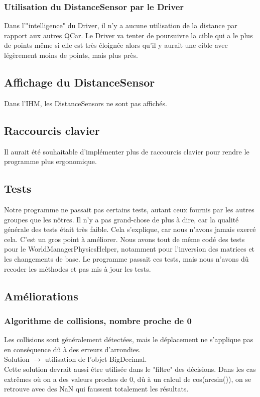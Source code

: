 \documentclass[a4paper, 12pt]{article}
\begin{document}
\subsubsection{Utilisation du DistanceSensor par le Driver}
Dans l'"intelligence" du Driver, il n'y a aucune utilisation de la distance par rapport aux autres QCar. Le Driver va tenter de poursuivre la cible qui a le plus de points même si elle est très éloignée alors qu'il y aurait une cible avec légèrement moins de points, mais plus près.
\subsection{Affichage du DistanceSensor} Dans l'IHM, les DistanceSensors ne sont pas affichés.
\subsection{Raccourcis clavier} Il aurait été souhaitable d'implémenter plus de raccourcis clavier pour rendre le programme plus ergonomique. 
\subsection{Tests}
Notre programme ne passait pas certains tests, autant ceux fournis par les autres groupes que les nôtres. Il n'y a pas grand-chose de plus à dire, car la qualité générale des tests était très faible. Cela s'explique, car nous n'avons jamais exercé cela. C'est un gros point à améliorer. Nous avons tout de même codé des tests pour le WorldManagerPhysicsHelper, notamment pour l'inversion des matrices et les changements de base. Le programme passait ces tests, mais nous n’avons dû recoder les méthodes et pas mis à jour les tests.
\subsection{Améliorations}
\subsubsection{Algorithme de collisions, nombre proche de 0}           
Les collisions sont généralement détectées, mais le déplacement ne s'applique pas en conséquence dû à des erreurs d'arrondies.\\
Solution $\rightarrow$ utilisation de l'objet BigDecimal.\\
Cette solution devrait aussi être utilisée dans le "filtre" des décisions. Dans les cas extrêmes où on a des valeurs proches de 0, dû à un calcul de cos(arcsin()), on se retrouve avec des NaN qui faussent totalement les résultats.
\end{document}
